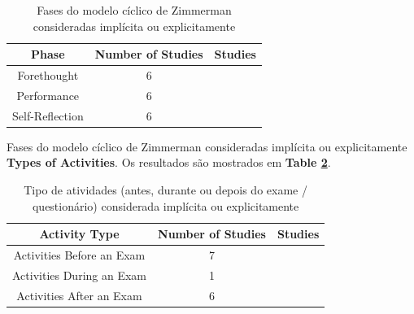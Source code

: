 \begin{table}[ht]
    \centering
        \caption{Fases do modelo cíclico de Zimmerman consideradas implícita ou explicitamente}
        \begin{tabular}{c|c|c}
            \hline
                \textbf{Phase} & \textbf{Number of Studies}  & \textbf{Studies} \\
            \hline
            \hline
                Forethought &
                6 &
                \cite{coore_facilitating_2019, luxton-reilly_introductory_2018, krugel_computational_2017, herold_student_2012, verdu_distributed_2012, wu_improvement_2011} \\
            \hline
                Performance &
                6 & 
                \cite{petri_quality_2017, coore_facilitating_2019, luxton-reilly_introductory_2018, ogawa_evaluation_2018, krugel_computational_2017, verdu_distributed_2012} \\
            \hline
                Self-Reflection &
                6 &
                \cite{petri_quality_2017, figueiredo_evaluation_2014, coore_facilitating_2019, luxton-reilly_introductory_2018, krugel_computational_2017, thevathayan_imparting_2017} \\
            \hline
        \end{tabular}
    \label{tab:zimmerman_phase}
\end{table}

Fases do modelo cíclico de Zimmerman consideradas implícita ou explicitamente \textbf{Types of Activities}. Os resultados são mostrados em \textbf{Table \ref{tab:activities_types}}.

\begin{table}[ht]
    \centering
        \caption{Tipo de atividades (antes, durante ou depois do exame / questionário) considerada implícita ou explicitamente}
        \begin{tabular}{c|c|c}
            \hline
                \textbf{Activity Type} & \textbf{Number of Studies}  & \textbf{Studies} \\
            \hline
            \hline
                Activities Before an Exam &
                7 & 
                \cite{figueiredo_evaluation_2014, coore_facilitating_2019, luxton-reilly_introductory_2018, ogawa_evaluation_2018, herold_student_2012, verdu_distributed_2012, wu_improvement_2011} \\
            \hline
                Activities During an Exam &
                1  &
                \cite{verdu_distributed_2012} \\
            \hline
                Activities After an Exam &
                6 &
                \cite{petri_quality_2017, figueiredo_evaluation_2014, coore_facilitating_2019, luxton-reilly_introductory_2018, krugel_computational_2017, thevathayan_imparting_2017} \\
            \hline
        \end{tabular}
    \label{tab:activities_types}
\end{table}


